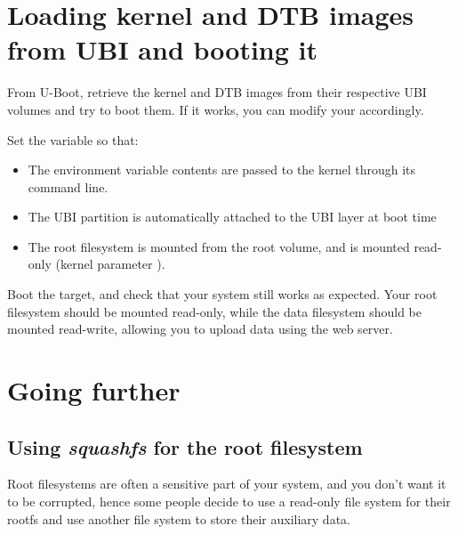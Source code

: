 \section{Loading kernel and DTB images from UBI and booting it}

From U-Boot, retrieve the kernel and DTB images from their respective
UBI volumes and try to boot them. If it works, you can modify your
 accordingly.

Set the  variable so that:

\begin{itemize}
\item The  environment variable contents are passed to
  the kernel through its command line. 
\item The UBI partition is automatically attached to the UBI layer at
  boot time
\item The root filesystem is mounted from the root volume, and is mounted
  read-only (kernel parameter ).
\end{itemize}

Boot the target, and check that your system still works as
expected. Your root filesystem should be mounted read-only, while the
data filesystem should be mounted read-write, allowing you to upload
data using the web server.


\section{Going further}

\subsection{Using {\em squashfs} for the root filesystem}

Root filesystems are often a sensitive part of your system, and you don't
want it to be corrupted, hence some people decide to use a read-only
file system for their rootfs and use another file system to store their
auxiliary data.

